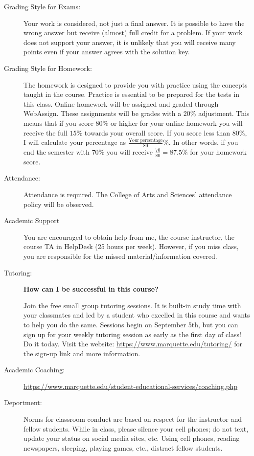 \documentclass[10pt]{article}
\begin{document}
\begin{description}
\item [Grading Style for Exams:] Your work is considered, not just a final answer. It is possible to have the wrong answer but receive (almost) full credit for a problem. If your work does not support your answer, it is unlikely that you will receive many points even if your answer agrees with the solution key.

\item [Grading Style for Homework:] The homework is designed to provide you with practice using the concepts taught in the course. Practice is essential to be prepared for the tests in this class. Online homework will be assigned and graded through WebAssign. These assignments will be grades with a $20\%$ adjustment. This means that if you score $80\%$ or higher for your online homework you will receive the full $15\%$ towards your overall score. If you score less than $80\%$, I will calculate your percentage as $\frac{\mathrm{Your\ percentage}}{80}\%$. In other words, if you end the semester with $70\%$ you will receive $\frac{70}{80}=87.5\%$ for your homework score.

\item [Attendance:] Attendance is required. The College of Arts and Sciences’ attendance policy will be observed. 

\item[Academic Support] You are encouraged to obtain help from me, the course instructor, the course TA in {\color{red} HelpDesk (25 hours per week)}. However, if you miss class, you are responsible for the missed material/information covered.\vspace{.1in}

\item [Tutoring:] \textbf{How can I be successful in this course?}

Join the free small group tutoring sessions. It is built-in study time with your classmates and led by a student who excelled in this course and wants to help you do the same.  Sessions begin on September 5th, but you can sign up for your weekly tutoring session as early as the first day of class!   Do it today.  Visit the website: \url{https://www.marquette.edu/tutoring/} for the sign-up link and more information.

\item[Academic Coaching:] \url{https://www.marquette.edu/student-educational-services/coaching.php}

\item[Deportment:] Norms for classroom conduct are based on respect for the instructor and fellow students. While in class, please silence your cell phones; do not text, update your status on social media sites, etc. Using cell phones, reading newspapers, sleeping, playing games, etc., distract fellow students.


\end{description}
\end{document}
